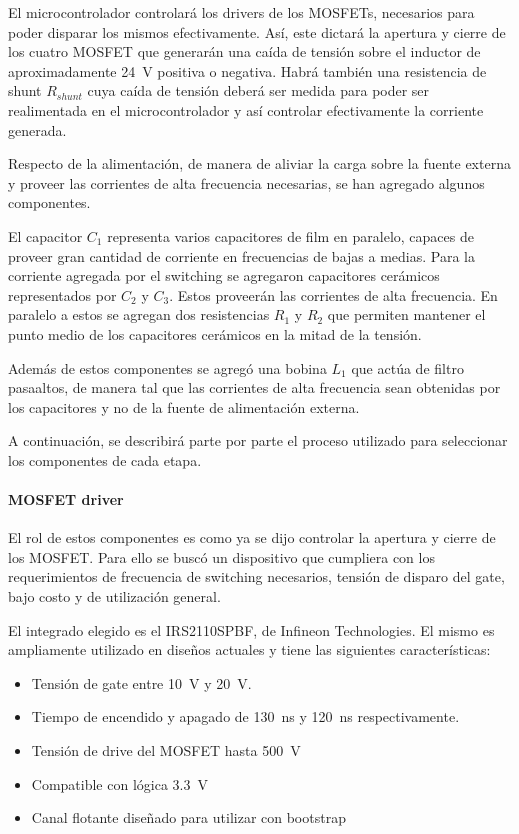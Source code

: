 \documentclass[titlepage, 12pt]{article}
\begin{document}
El microcontrolador controlará los drivers de los MOSFETs, necesarios para poder disparar los mismos efectivamente. Así, este dictará la apertura y cierre de los cuatro MOSFET que generarán una caída de tensión sobre el inductor de aproximadamente \SI{24}{V} positiva o negativa. Habrá también una resistencia de shunt $R_{shunt}$ cuya caída de tensión deberá ser medida para poder ser realimentada en el microcontrolador y así controlar efectivamente la corriente generada.

Respecto de la alimentación, de manera de aliviar la carga sobre la fuente externa y proveer las corrientes de alta frecuencia necesarias, se han agregado algunos componentes.

El capacitor $C_1$ representa varios capacitores de film en paralelo, capaces de proveer gran cantidad de corriente en frecuencias de bajas a medias. Para la corriente agregada por el switching se agregaron capacitores cerámicos representados por $C_2$ y $C_3$. Estos proveerán las corrientes de alta frecuencia. En paralelo a estos se agregan dos resistencias $R_1$ y $R_2$ que permiten mantener el punto medio de los capacitores cerámicos en la mitad de la tensión.

Además de estos componentes se agregó una bobina $L_1$ que actúa de filtro pasaaltos, de manera tal que las corrientes de alta frecuencia sean obtenidas por los capacitores y no de la fuente de alimentación externa.

A continuación, se describirá parte por parte el proceso utilizado para seleccionar los componentes de cada etapa.

\paragraph{MOSFET driver}
El rol de estos componentes es como ya se dijo controlar la apertura y cierre de los MOSFET. Para ello se buscó un dispositivo que cumpliera con los requerimientos de frecuencia de switching necesarios, tensión de disparo del gate, bajo costo y de utilización general.

El integrado elegido es el IRS2110SPBF, de Infineon Technologies. El mismo es ampliamente utilizado en diseños actuales y tiene las siguientes características:
    \begin{itemize}
        \item Tensión de gate entre \SI{10}{V} y \SI{20}{V}.
        \item Tiempo de encendido y apagado de \SI{130}{ns} y \SI{120}{ns} respectivamente.
        \item Tensión de drive del MOSFET hasta \SI{500}{V}
        \item Compatible con lógica \SI{3.3}{V}
        \item Canal flotante diseñado para utilizar con bootstrap
    \end{itemize}
\end{document}
